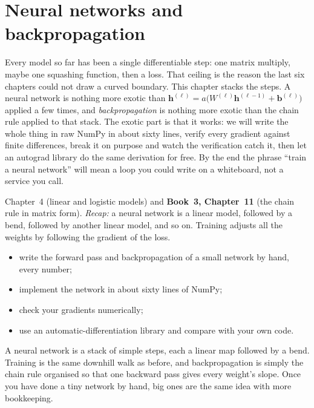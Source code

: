 \chapter{Neural networks and backpropagation}
\label{ch:nn}

Every model so far has been a single differentiable step: one matrix
multiply, maybe one squashing function, then a loss. That ceiling is the
reason the last six chapters could not draw a curved boundary. This
chapter stacks the steps. A neural network is
nothing more exotic than
$\mathbf h^{(\ell)} = a\bigl(W^{(\ell)}\mathbf h^{(\ell-1)} + \mathbf b^{(\ell)}\bigr)$
applied a few times, and \emph{backpropagation} is
nothing more exotic than the chain rule applied to that stack. The
exotic part is that it works: we will write the whole thing in raw NumPy
in about sixty lines, verify every gradient against finite differences,
break it on purpose and watch the verification catch it, then let an
autograd library do the same derivation for free. By the end the phrase
``train a neural network'' will mean a loop you could write on a
whiteboard, not a service you call.

\begin{rulebox}
Chapter~4 (linear and logistic models) and \textbf{Book~3, Chapter~11} (the chain rule in matrix form). \emph{Recap:} a neural network is a linear model, followed by a bend, followed by another linear model, and so on. Training adjusts all the weights by following the gradient of the loss.
\end{rulebox}
\begin{wins}
\begin{itemize}
\item write the forward pass and backpropagation of a small network by hand, every number;
\item implement the network in about sixty lines of NumPy;
\item check your gradients numerically;
\item use an automatic-differentiation library and compare with your own code.
\end{itemize}
\end{wins}
\begin{principle}
A neural network is a stack of simple steps, each a linear map followed by a bend. Training is the same downhill walk as before, and backpropagation is simply the chain rule organised so that one backward pass gives every weight's slope. Once you have done a tiny network by hand, big ones are the same idea with more bookkeeping.
\end{principle}

